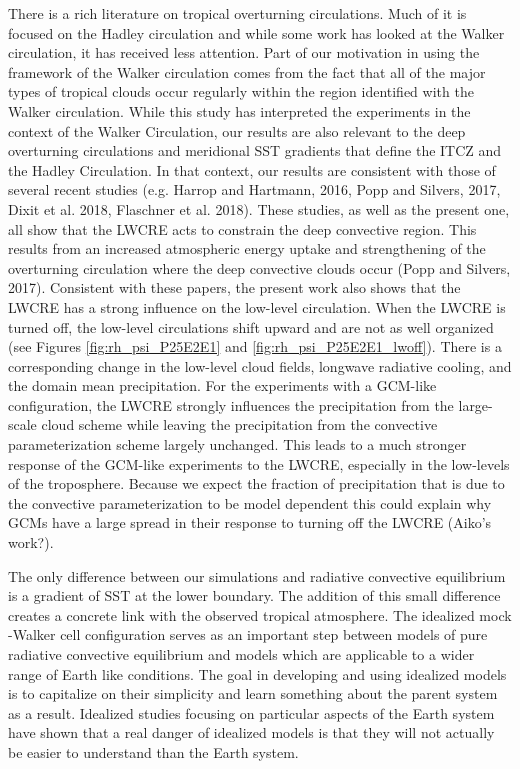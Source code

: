 \documentclass[draft]{agujournal2019}
\begin{document}
There is a rich literature on tropical overturning circulations.  Much of it is focused on the Hadley circulation and while some
work has looked at the Walker circulation, it has received less attention.  Part of our motivation in using the framework of the 
Walker circulation comes from the fact that all of the major types of tropical clouds occur regularly within the region 
identified with the Walker circulation.  While this study has interpreted the experiments in the context of the Walker 
Circulation, our results are also relevant to the deep overturning circulations and meridional SST gradients that define 
the ITCZ and the Hadley Circulation.  In that context, our results are consistent with those of several recent studies 
(e.g. Harrop and Hartmann, 2016, 
Popp and Silvers, 2017, Dixit et al. 2018, Flaschner et al. 2018).  These studies, as well as the present one, all show that the 
LWCRE acts to constrain the deep convective region.  This results from an increased atmospheric energy uptake and 
strengthening of the overturning circulation where the deep convective clouds occur (Popp and Silvers, 2017).  Consistent with 
these papers, the present work also shows that the LWCRE has a strong influence on the low-level circulation.   When 
the LWCRE is turned off, the low-level circulations shift upward and are not as well organized (see Figures \ref{fig:rh_psi_P25E2E1} and \ref{fig:rh_psi_P25E2E1_lwoff}).
There is a corresponding change in the low-level cloud fields, longwave radiative cooling, and the domain mean precipitation.
For the experiments with a GCM-like configuration, the LWCRE strongly influences the precipitation from the large-scale
cloud scheme while leaving the precipitation from the convective parameterization scheme largely unchanged.  This leads 
to a much stronger response of the GCM-like experiments to the LWCRE, especially in the low-levels of the troposphere.  
Because we expect the fraction of precipitation that is due to the convective parameterization to be model dependent 
this could explain why GCMs have a large spread in their response to turning off the LWCRE (Aiko's work?). 

The only difference between our simulations and radiative convective equilibrium is a gradient of SST at the lower boundary.
The addition of this small difference creates a concrete link with the observed tropical atmosphere.  The idealized 
mock -Walker cell configuration serves as an important step between models of pure radiative convective equilibrium
and models which are applicable to a wider range of Earth like conditions.   The goal in developing and using idealized models is to capitalize on their simplicity and learn something about the 
parent system as a result.  Idealized studies focusing on particular aspects of the Earth system have shown that a 
real danger of idealized models is that they will not actually be easier to understand than the Earth system.  
\end{document}
